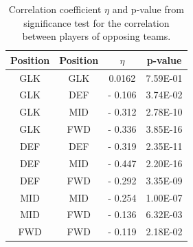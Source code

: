 \begin{table}[H]
\centering
\begin{tabular}{|c|c|c|c|}
\hline
Position & Position & $\eta$ & p-value  \\
\hline
GLK      & GLK      & 0.0162  & 7.59E-01  \\
GLK      & DEF      & - 0.106 & 3.74E-02  \\
GLK      & MID      & - 0.312 & 2.78E-10 \\
GLK      & FWD      & - 0.336 & 3.85E-16 \\
DEF      & DEF      & - 0.319 & 2.35E-11 \\
DEF      & MID      & - 0.447 & 2.20E-16 \\
DEF      & FWD      & - 0.292 & 3.35E-09 \\
MID      & MID      & - 0.254 & 1.00E-07 \\
MID      & FWD      & - 0.136 & 6.32E-03  \\
FWD      & FWD      & - 0.119 & 2.18E-02 \\
\hline
\end{tabular}
\caption{Correlation coefficient $\eta$ and p-value from significance test for the correlation between players of opposing teams.}
\label{tab:cor_opp}
\end{table}